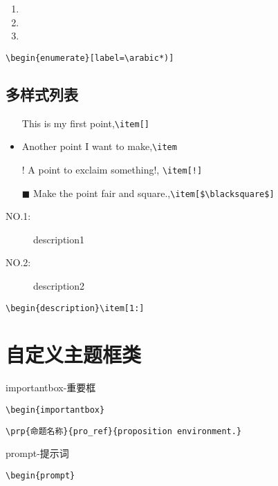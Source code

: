 \begin{enumerate}[label=\arabic*)]
    \item 
    \item 
    \item 
\end{enumerate}\verb|\begin{enumerate}[label=\arabic*)]|


\subsection{多样式列表}
\begin{itemize}
  \item[]  This is my first point,\verb|\item[]|%
  \item Another point I want to make,\verb|\item | %
  \item[!] A point to exclaim something!, \verb|\item[!]|%
  \item[$\blacksquare$] Make the point fair and square.,\verb|\item[$\blacksquare$]|%
\end{itemize}

\begin{description}
    \item[NO.1:] description1
    \item[NO.2:] description2
\end{description}\verb|\begin{description}\item[1:]|

\section{自定义主题框类}

\begin{importantbox}
    importantbox-重要框
\end{importantbox}\verb|\begin{importantbox}|

\verb|\prp{命题名称}{pro_ref}{proposition environment.}|

\begin{prompt}
    prompt-提示词
\end{prompt}\verb|\begin{prompt}|

